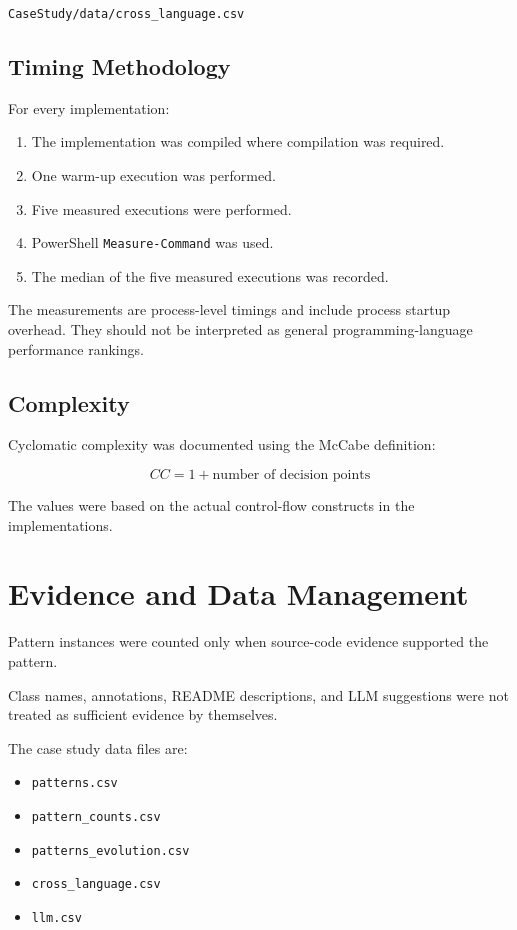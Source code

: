 \documentclass[12pt,a4paper]{article}
\begin{document}
\texttt{CaseStudy/data/cross\_language.csv}

\subsection{Timing Methodology}

For every implementation:

\begin{enumerate}
    \item The implementation was compiled where compilation was required.
    \item One warm-up execution was performed.
    \item Five measured executions were performed.
    \item PowerShell \texttt{Measure-Command} was used.
    \item The median of the five measured executions was recorded.
\end{enumerate}

The measurements are process-level timings and include process startup overhead. They should not be interpreted as general programming-language performance rankings.

\subsection{Complexity}

Cyclomatic complexity was documented using the McCabe definition:

\[
CC = 1 + \text{number of decision points}
\]

The values were based on the actual control-flow constructs in the implementations.

\section{Evidence and Data Management}

Pattern instances were counted only when source-code evidence supported the pattern.

Class names, annotations, README descriptions, and LLM suggestions were not treated as sufficient evidence by themselves.

The case study data files are:

\begin{itemize}
    \item \texttt{patterns.csv}
    \item \texttt{pattern\_counts.csv}
    \item \texttt{patterns\_evolution.csv}
    \item \texttt{cross\_language.csv}
    \item \texttt{llm.csv}
\end{itemize}
\end{document}
